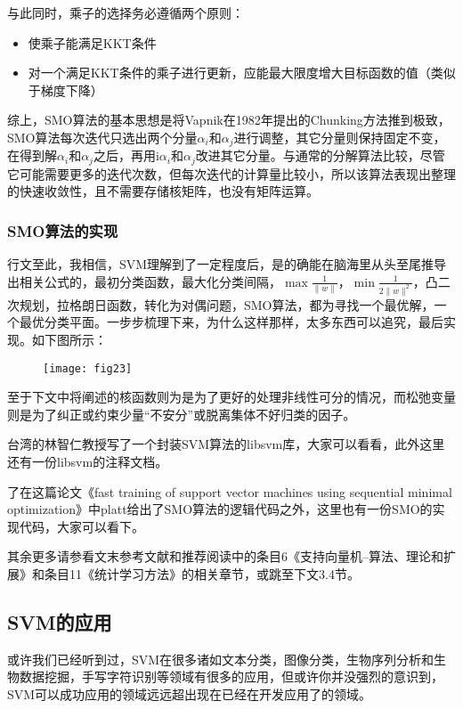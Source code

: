 \documentclass[a4paper,12pt]{article}
\begin{document}
与此同时，乘子的选择务必遵循两个原则：
 \begin{itemize}
  \item 使乘子能满足KKT条件
 \item 对一个满足KKT条件的乘子进行更新，应能最大限度增大目标函数的值（类似于梯度下降）
 \end{itemize}
 
 综上，SMO算法的基本思想是将Vapnik在1982年提出的Chunking方法推到极致，SMO算法每次迭代只选出两个分量$\alpha_i$和$\alpha_j$进行调整，其它分量则保持固定不变，在得到解$\alpha_i$和$\alpha_j$之后，再用i$\alpha_i$和$\alpha_j$改进其它分量。与通常的分解算法比较，尽管它可能需要更多的迭代次数，但每次迭代的计算量比较小，所以该算法表现出整理的快速收敛性，且不需要存储核矩阵，也没有矩阵运算。

 \subsubsection{SMO算法的实现}
 行文至此，我相信，SVM理解到了一定程度后，是的确能在脑海里从头至尾推导出相关公式的，最初分类函数，最大化分类间隔，$\max\frac{1}{\|w\|}$，$\min\frac{1}{2\|w\|^2}$，凸二次规划，拉格朗日函数，转化为对偶问题，SMO算法，都为寻找一个最优解，一个最优分类平面。一步步梳理下来，为什么这样那样，太多东西可以追究，最后实现。如下图所示：
\begin{figure}[H]
  \centering
  \texttt{[image: fig23]}
\end{figure}
至于下文中将阐述的核函数则为是为了更好的处理非线性可分的情况，而松弛变量则是为了纠正或约束少量“不安分”或脱离集体不好归类的因子。

台湾的林智仁教授写了一个封装SVM算法的libsvm库，大家可以看看，此外这里还有一份libsvm的注释文档。

了在这篇论文《fast training of support vector machines using sequential minimal optimization》中platt给出了SMO算法的逻辑代码之外，这里也有一份SMO的实现代码，大家可以看下。

其余更多请参看文末参考文献和推荐阅读中的条目6《支持向量机--算法、理论和扩展》和条目11《统计学习方法》的相关章节，或跳至下文3.4节。

\subsection{SVM的应用}

或许我们已经听到过，SVM在很多诸如文本分类，图像分类，生物序列分析和生物数据挖掘，手写字符识别等领域有很多的应用，但或许你并没强烈的意识到，SVM可以成功应用的领域远远超出现在已经在开发应用了的领域。
\end{document}
